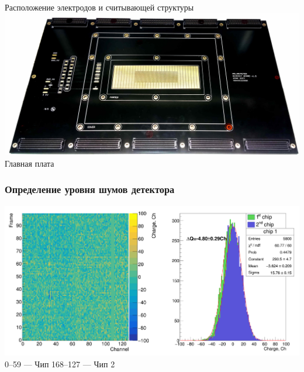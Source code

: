\documentclass[14pt]{beamer}
\begin{document}
\begin{frame}[t]
\begin{minipage}[t]{0.39\linewidth}
		\tiny{Расположение электродов и считывающей структуры}
		\includegraphics[width=1\linewidth]{Main_board.jpg} 
		\newline \centering\tiny{Главная плата}
		\end{minipage}	
\end{frame}

\begin{frame}[c]
\frametitle{Определение уровня шумов детектора}
	\includegraphics[width=1\linewidth]{Noise_no_filtering.png}
	 \hspace*{20pt}\tiny{0--59 --- Чип 1}\hspace*{30pt}\tiny{68--127 --- Чип 2}
\end{frame}
\end{document}
